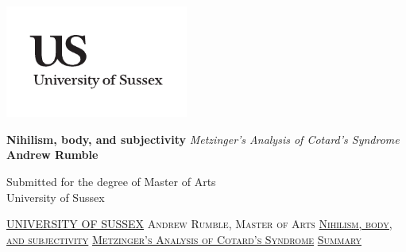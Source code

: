\documentclass[a4paper,11pt]{report}
\newcommand{\linespacing}{1.5}
\renewcommand{\baselinestretch}{\linespacing}
\begin{document}




\thispagestyle{empty}
\begin{flushright}
\includegraphics[width=6cm]{uslogo}
\end{flushright}	
\vskip40mm
\begin{center}
\huge\textbf{Nihilism, body, and subjectivity}
\vskip2mm
\LARGE\textit{Metzinger's Analysis of Cotard's Syndrome}
\vskip5mm
\Large\textbf{Andrew Rumble}
\normalsize
\end{center}
\vfill
\begin{flushleft}
\large
Submitted for the degree of Master of Arts \\
University of Sussex	\\
\end{flushleft}		


\thispagestyle{empty}
\newpage
\null\vskip10mm
\begin{center}
\large
\underline{UNIVERSITY OF SUSSEX}
\vskip20mm
\textsc{Andrew Rumble, Master of Arts}
\vskip20mm
\underline{\textsc{Nihilism, body, and subjectivity}}
\vskip0mm
\underline{\textsc{Metzinger's Analysis of Cotard's Syndrome}}
\vskip20mm
\underline{\textsc{Summary}}
\vskip2mm
\end{center}
\renewcommand{\baselinestretch}{1.0}
\small\normalsize

\end{document}
